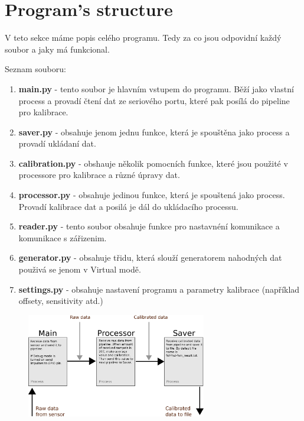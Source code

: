 \documentclass[12pt]{article}
\begin{document}
\section{Program's structure}
\par V teto sekce máme popis celého programu. Tedy za co jsou odpovidní každý
soubor a jaky má funkcional. 
\par Seznam souboru:
\begin{enumerate}
    \item \textbf{main.py} - tento soubor je hlavním vstupem do programu. Běží
        jako vlastní process a provadí čtení dat ze seriového portu, které pak
        posílá do pipeline pro kalibrace.
    \item \textbf{saver.py} - obsahuje jenom jednu funkce, která je spouštěna
        jako process a provadí ukládaní dat.
    \item \textbf{calibration.py} - obshauje několik pomocních funkce, které 
        jsou použité v processore pro kalibrace a různé úpravy dat.
    \item \textbf{processor.py} - obsahuje jedinou funkce, která je spouštená
        jako process. Provadí kalibrace dat a posilá je dál do ukládacího
        processu.
    \item \textbf{reader.py} - tento soubor obsahuje funkce pro nastavnéní 
        komunikace a komunikace s zářizenim. 
    \item \textbf{generator.py} - obsahuje třidu, která slouží generatorem 
        nahodných dat použivá se jenom v Virtual modě.
    \item \textbf{settings.py} - obsahuje nastavení programu a parametry 
        kalibrace (například offsety, sensitivity atd.)
\end{enumerate}

\begin{figure}[htb!]
    \centering
    \includegraphics[width=0.7\textwidth]{./structure.eps}
\end{figure}
\end{document}
